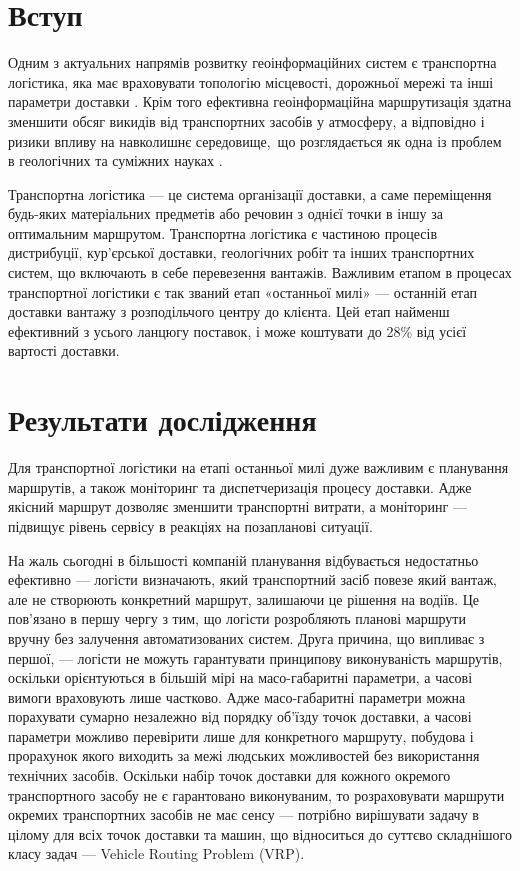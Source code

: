 \section{Вступ}
Одним з актуальних напрямів розвитку геоінформаційних систем є транспортна логістика, яка має враховувати топологію місцевості, дорожньої мережі та інші параметри доставки \cite{Markelov_2015}. Крім того ефективна геоінформаційна маршрутизація здатна зменшити обсяг викидів від транспортних засобів у атмосферу, а відповідно і ризики впливу на навколишнє середовище, що розглядається як одна із проблем в геологічних та суміжних науках \cite{Zhukov_2013}.

Транспортна логістика --- це система організації доставки, а саме переміщення будь-яких матеріальних предметів або речовин з однієї точки в іншу за оптимальним маршрутом. Транспортна логістика є частиною процесів дистрибуції, кур’єрської доставки, геологічних робіт та інших транспортних систем, що включають в себе перевезення вантажів. Важливим етапом в процесах транспортної логістики є так званий етап «останньої милі» --- останній етап доставки вантажу з розподільчого центру до клієнта. Цей етап найменш ефективний з усього ланцюгу поставок, і може коштувати до 28\% від усієї вартості доставки. \cite{Scott_2009}

\section{Результати дослідження}

Для транспортної логістики на етапі останньої милі дуже важливим є планування маршрутів, а також моніторинг та диспетчеризація процесу доставки. Адже якісний маршрут дозволяє зменшити транспортні витрати, а моніторинг — підвищує рівень сервісу в реакціях на позапланові ситуації.

На жаль сьогодні в більшості компаній планування відбувається недостатньо ефективно — логісти визначають, який транспортний засіб повезе який вантаж, але не створюють конкретний маршрут, залишаючи це рішення на водіїв. Це пов’язано в першу чергу з тим, що логісти розробляють планові маршрути вручну без залучення автоматизованих систем. Друга причина, що випливає з першої, — логісти не можуть гарантувати принципову виконуваність маршрутів, оскільки орієнтуються в більшій мірі на масо-габаритні параметри, а часові вимоги враховують лише частково. Адже масо-габаритні параметри можна порахувати сумарно незалежно від порядку об’їзду точок доставки, а часові параметри можливо перевірити лише для конкретного маршруту, побудова і прорахунок якого виходить за межі людських можливостей без використання технічних засобів. Оскільки набір точок доставки для кожного окремого транспортного засобу не є гарантовано виконуваним, то розраховувати маршрути окремих транспортних засобів не має сенсу — потрібно вирішувати задачу в цілому для всіх точок доставки та машин, що відноситься до суттєво складнішого класу задач — Vehicle Routing Problem (VRP).

